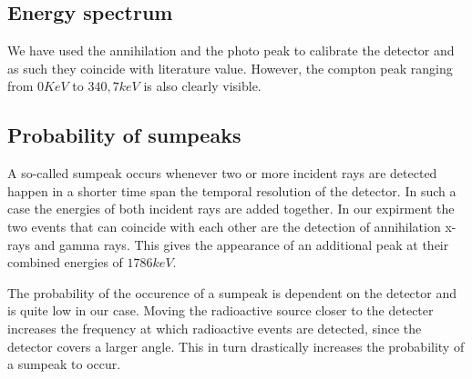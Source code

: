\documentclass[bigchapter,colorback,accentcolor=tud4b,linedtoc,11pt]{tudreport}
\begin{document}
\subsection{Energy spectrum}
We have used the annihilation and the photo peak to calibrate the detector and
as such they coincide with literature value. However, the compton peak ranging
from $0 KeV$ to $340,7 keV$ is also clearly visible.




\subsection{Probability of sumpeaks}
A so-called sumpeak occurs whenever two or more incident rays are detected happen in a
shorter time span the temporal resolution of the detector. In such a case the
energies of both incident rays are added together. In our expirment the two
events that can coincide with each other are the detection of annihilation
x-rays and gamma rays. This gives the appearance of an additional peak at their
combined energies of $1786 keV$.

The probability of the occurence of a sumpeak is dependent on the detector and
is quite low in our case. Moving the radioactive source closer to the detecter
increases the frequency at which radioactive events are detected, since the
detector covers a larger angle. This in turn drastically increases the
probability of a sumpeak to occur.
\end{document}
